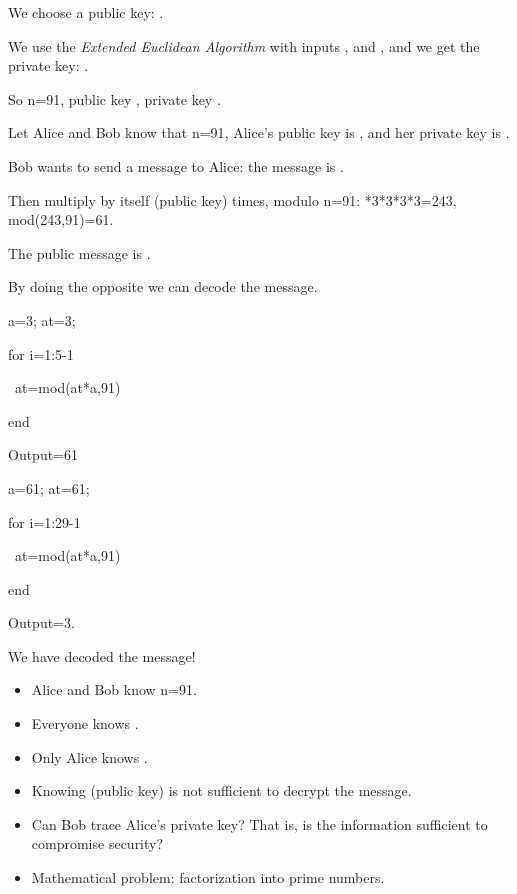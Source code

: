 We choose a public key: {}.

We use the \textit{Extended Euclidean Algorithm} with inputs {}, {} and {}, and we get the private key: {}.

So {\selectfont n=91}, public key {}, private key {}.

Let Alice and Bob know that {\selectfont n=91}, Alice's public key is {}, and her private key is {}.

Bob wants to send a message to Alice: the message is {}.

Then multiply {} by itself {} (public key) times, modulo {\selectfont n=91}: {*3*3*3*3=243}, {\selectfont mod(243,91)=61}.

The public message is {}.

By doing the opposite we can decode the message.

{\selectfont a=3; at=3;}

{\selectfont for i=1:5-1}

{\selectfont  \ at=mod(at*a,91)}

{\selectfont end}

{\selectfont Output=61}

{\selectfont a=61; at=61;}

{\selectfont for i=1:29-1}

{\selectfont  \ at=mod(at*a,91)}

{\selectfont end}

{\selectfont Output=3.}

We have decoded the message!

\begin{itemize}
	\item Alice and Bob know {\selectfont n=91}.
	\item Everyone knows {}.
	\item Only Alice knows {}.
	\item Knowing {} (public key) is not sufficient to decrypt the message.
	\item Can Bob trace Alice's private key? That is, is the information {} sufficient to compromise security?
	\item Mathematical problem: factorization into prime numbers.
\end{itemize}

